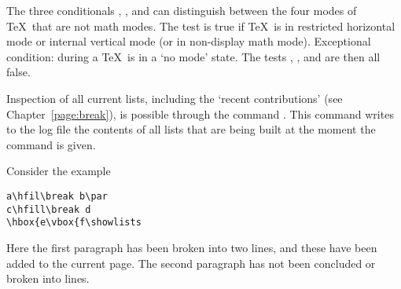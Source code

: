 \documentclass[twoside,letterpaper,openright]{rapport3}
\begin{document}
The three conditionals , , and
 can distinguish between the four modes of
\TeX\ that are not math modes.
The  test is true if \TeX\ is in 
restricted horizontal mode or internal vertical mode
(or in non-display math mode).
Exceptional condition: during a  \TeX\
is in a `no mode' state. The tests ,
, and  are then all false.

Inspection of all current lists, including the `recent
contributions' (see Chapter~\ref{page:break}),
is possible through the command \label{showlists}.
This command writes to the log file the contents of all
lists that are being built at the moment the command is given.

Consider the example
\begin{verbatim}
a\hfil\break b\par 
c\hfill\break d
\hbox{e\vbox{f\showlists
\end{verbatim}
Here the first paragraph has been broken into two lines, and
these have been added to the current page. The second paragraph
has not been concluded or broken into lines.
\end{document}
